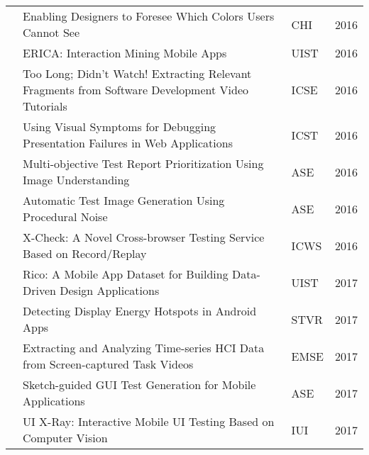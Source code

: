 \begin{sidewaystable}
\begin{tabular}{@{} lp{12.9cm}ll @{}}
\citet{Reinecke-2016-CHI}    & Enabling Designers to Foresee Which Colors Users Cannot See                                                                         & CHI            & 2016          \\

\citet{Deka-2016-UIST}       & ERICA: Interaction Mining Mobile Apps                                                                                               & UIST           & 2016          \\
\citet{Ponzanelli-2016-ICSE} & Too Long; Didn’t Watch! Extracting Relevant Fragments from Software Development Video Tutorials                                     & ICSE           & 2016          \\
\citet{Mahajan-2016-ICST}    & Using Visual Symptoms for Debugging Presentation Failures in Web Applications                                                       & ICST           & 2016          \\
\citet{Feng-2016-ASE}        & Multi-objective Test Report Prioritization Using Image Understanding                                                                & ASE            & 2016          \\
\citet{Patric-2016-ASE}      & Automatic Test Image Generation Using Procedural Noise                                                                              & ASE            & 2016          \\
\citet{He-2016-ICWS}         & X-Check: A Novel Cross-browser Testing Service Based on Record/Replay                                                               & ICWS           & 2016          \\

\citet{Deka-2017-UIST}       & Rico: A Mobile App Dataset for Building Data-Driven Design Applications                                                             & UIST           & 2017          \\
\citet{Wan-2017-STVR}        & Detecting Display Energy Hotspots in Android Apps                                                                                   & STVR           & 2017          \\
\citet{Bao-2017-EMSE}        & Extracting and Analyzing Time-series HCI Data from Screen-captured Task Videos                                                      & EMSE           & 2017          \\
\citet{Zhang-2017-ASE}       & Sketch-guided GUI Test Generation for Mobile Applications                                                                           & ASE            & 2017          \\
\citet{Chen-2017-IUI}        & UI X-Ray: Interactive Mobile UI Testing Based on Computer Vision                                                                    & IUI            & 2017          \\


\end{tabular}
\end{sidewaystable}
